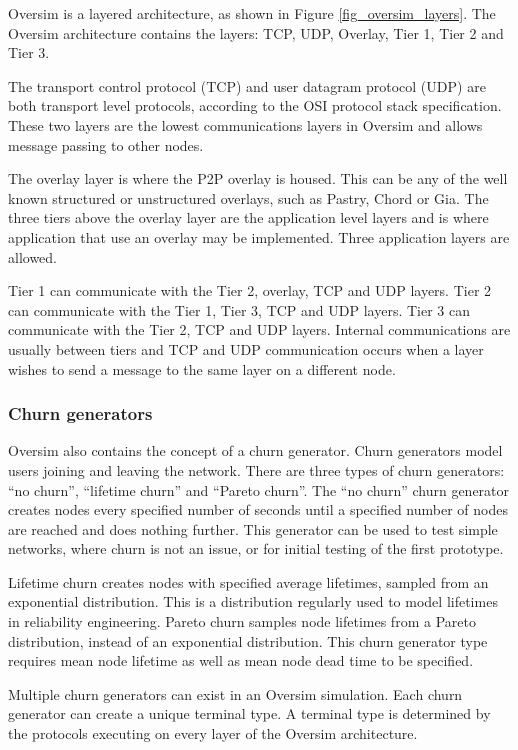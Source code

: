 
Oversim is a layered architecture, as shown in Figure \ref{fig_oversim_layers}. The Oversim architecture contains the layers: TCP, UDP, Overlay, Tier 1, Tier 2 and Tier 3.

The transport control protocol (TCP) and user datagram protocol (UDP) are both transport level protocols, according to the OSI protocol stack specification. These two layers are the lowest communications layers in Oversim and allows message passing to other nodes.

The overlay layer is where the P2P overlay is housed. This can be any of the well known structured or unstructured overlays, such as Pastry, Chord or Gia. The three tiers above the overlay layer are the application level layers and is where application that use an overlay may be implemented. Three application layers are allowed.

Tier 1 can communicate with the Tier 2, overlay, TCP and UDP layers. Tier 2 can communicate with the Tier 1, Tier 3, TCP and UDP layers. Tier 3 can communicate with the Tier 2, TCP and UDP layers. Internal communications are usually between tiers and TCP and UDP communication occurs when a layer wishes to send a message to the same layer on a different node.

        \subsubsection{Churn generators}

Oversim also contains the concept of a churn generator. Churn generators model users joining and leaving the network. There are three types of churn generators: ``no churn'', ``lifetime churn'' and ``Pareto churn''. The ``no churn'' churn generator creates nodes every specified number of seconds until a specified number of nodes are reached and does nothing further. This generator can be used to test simple networks, where churn is not an issue, or for initial testing of the first prototype.

Lifetime churn creates nodes with specified average lifetimes, sampled from an exponential distribution. This is a distribution regularly used to model lifetimes in reliability engineering. Pareto churn samples node lifetimes from a Pareto distribution, instead of an exponential distribution. This churn generator type requires mean node lifetime as well as mean node dead time to be specified.

Multiple churn generators can exist in an Oversim simulation. Each churn generator can create a unique terminal type. A terminal type is determined by the protocols executing on every layer of the Oversim architecture.

